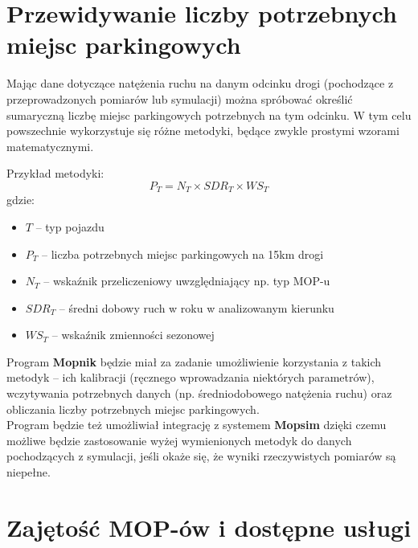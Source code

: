 \section{Przewidywanie liczby potrzebnych miejsc parkingowych}
Mając dane dotyczące natężenia ruchu na danym odcinku drogi (pochodzące z
przeprowadzonych pomiarów lub symulacji) można spróbować określić sumaryczną
liczbę miejsc parkingowych potrzebnych na tym odcinku. W tym celu powszechnie
wykorzystuje się różne metodyki, będące zwykle prostymi wzorami matematycznymi.

Przykład metodyki: 
$$ P_T = N_T \times SDR_T \times WS_T $$
gdzie:
\begin{itemize}
  \item $T$ -- typ pojazdu
  \item $P_T$ -- liczba potrzebnych miejsc parkingowych na 15km drogi
  \item $N_T$ -- wskaźnik przeliczeniowy uwzględniający np. typ MOP-u
  \item $SDR_T$ -- średni dobowy ruch w roku w analizowanym kierunku 
  \item $WS_T$ -- wskaźnik zmienności sezonowej
\end{itemize}
Program \textbf{Mopnik} będzie miał za zadanie umożliwienie korzystania z
takich metodyk -- ich kalibracji (ręcznego wprowadzania niektórych parametrów),
wczytywania potrzebnych danych (np. średniodobowego natężenia ruchu)
oraz obliczania liczby potrzebnych miejsc parkingowych. \\
Program będzie też umożliwiał integrację z systemem \textbf{Mopsim} dzięki
czemu możliwe będzie zastosowanie wyżej wymienionych metodyk do danych
pochodzących z symulacji, jeśli okaże się, że wyniki rzeczywistych pomiarów są
niepełne. 


\section{Zajętość MOP-ów i dostępne usługi}

